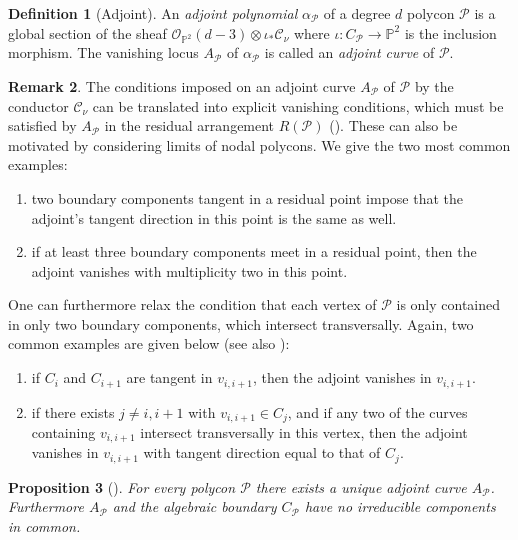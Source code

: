 \documentclass[a4paper,10pt]{amsart}
\theoremstyle{definition}
\newtheorem{defin}{Definition}[section]
\newtheorem{rem}[defin]{Remark}
\theoremstyle{plain}
\newtheorem{prop}[defin]{Proposition}
\newcommand{\cC}{{\mathcal C}}
\newcommand{\cO}{{\mathcal O}}
\newcommand{\cP}{{\mathcal P}}
\newcommand{\pp}{\mathbb{P}}
\begin{document}
\begin{defin}[Adjoint] \label{def: adjoint}
 An \emph{adjoint polynomial} $\alpha_\cP$ of a degree $d$ polycon $\cP$ is a global section of the sheaf $\cO_{\pp^2}(d-3) \otimes \iota_* \cC_\nu$ where $\iota \colon C_\cP \to \pp^2$ is the inclusion morphism. The vanishing locus $A_\cP$ of $\alpha_\cP$ is called an \emph{adjoint curve} of $\cP$.
\end{defin}

\begin{rem} \label{rem: AdjUnique_pathologies}
 The conditions imposed on an adjoint curve $A_\cP$ of $\cP$ by the conductor $\cC_\nu$ can be translated into explicit vanishing conditions, which must be satisfied by $A_\cP$ in the residual arrangement $R(\cP)$ (\cite[\S 5.1]{Wachspress2016Adjoints}). These can also be motivated by considering limits of nodal polycons. We give the two most common examples:
 \begin{enumerate}
     \item two boundary components tangent in a residual point impose that the adjoint's tangent direction in this point is the same as well.

     \item if at least three boundary components meet in a residual point, then the adjoint vanishes with multiplicity two in this point.
 \end{enumerate}
 One can furthermore relax the condition that each vertex of $\cP$ is only contained in only two boundary components, which intersect transversally. Again, two common examples are given below (see also \cite[Example 5.4]{Wachspress2016Adjoints}):
 \begin{enumerate}
     \item if $C_i$ and $C_{i+1}$ are tangent in $v_{i,i+1}$, then the adjoint vanishes in $v_{i,i+1}$.

     \item if there exists $j \neq i,i+1$ with $v_{i,i+1} \in C_j$, and if any two of the curves containing $v_{i,i+1}$ intersect transversally in this vertex, then the adjoint vanishes in $v_{i,i+1}$ with tangent direction equal to that of $C_j$.
 \end{enumerate}
\end{rem}

\begin{prop}[{\cite[Proposition 2.2]{KohnEtAl2024AdjCurves}}]\label{prop:uniqueAdj}
 For every polycon $\cP$ there exists a unique adjoint curve $A_\cP$. Furthermore $A_\cP$ and the algebraic boundary $C_\cP$ have no irreducible components in common.
\end{prop}
\end{document}
